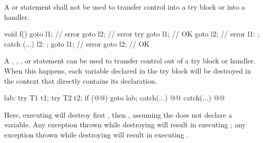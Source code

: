\pnum
{}%
%
%
%
%
%
A  or  statement shall not be used to transfer control
into a try block or into a handler.
\begin{example}
\begin{codeblock}
void f() {
  goto l1;          // error
  goto l2;          // error
  try {
    goto l1;        // OK
    goto l2;        // error
    l1: ;
  } catch (...) {
    l2: ;
    goto l1;        // error
    goto l2;        // OK
  }
}
\end{codeblock}
\end{example}
%
%
%
%
%
%
%
%
A
,
,
,
or
statement can be used to transfer control out of
a try block or handler.
When this happens, each variable declared in the try block
will be destroyed in the context that
directly contains its declaration.
\begin{example}
\begin{codeblock}
lab:  try {
  T1 t1;
  try {
    T2 t2;
    if (@@)
      goto lab;
    } catch(...) { @@ }
  } catch(...) { @@ }
\end{codeblock}

Here, executing
will destroy first
,
then
,
assuming the
does not declare a variable.
Any exception thrown while destroying
will result in executing
;
any exception thrown while destroying
will result in executing
.
\end{example}

